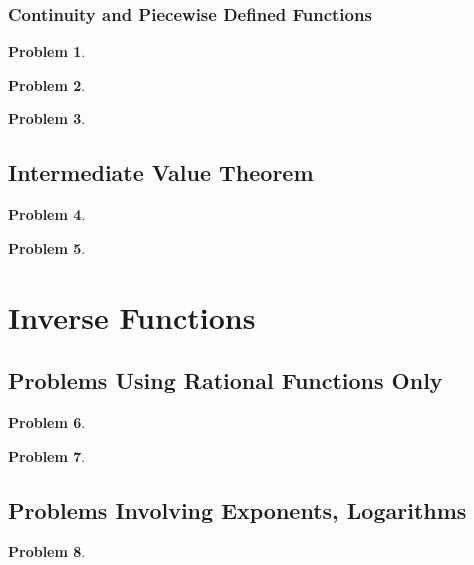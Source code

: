 \documentclass{article}
\newtheorem{problem}{Problem}
\begin{document}
\subsubsection{Continuity and Piecewise Defined Functions} \label{secMPScontinuityPiecewise}
\begin{problem}

\end{problem}
\begin{problem}

\end{problem}
\begin{problem}

\end{problem}
\subsection{Intermediate Value Theorem}\label{secMPSintermediateValueTheorem}
\begin{problem}

\end{problem}
\begin{problem}

\end{problem}

\section{Inverse Functions}\label{secMPSInverseFunctions}

\subsection{Problems Using Rational Functions Only}
\begin{problem}

\end{problem}


\begin{problem}

\end{problem}

\subsection{Problems Involving Exponents, Logarithms}
\begin{problem}

\end{problem}

\end{document}
